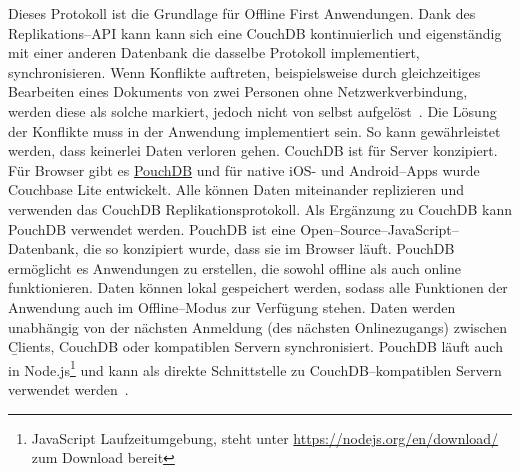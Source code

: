 Dieses Protokoll ist die Grundlage für Offline First Anwendungen.
Dank des Replikations--\gls{API} kann kann sich eine CouchDB kontinuierlich und eigenständig mit einer anderen Datenbank die dasselbe Protokoll implementiert, synchronisieren.
Wenn Konflikte auftreten, beispielsweise durch gleichzeitiges Bearbeiten eines Dokuments von zwei Personen ohne Netzwerkverbindung, werden diese als solche markiert, jedoch nicht von selbst aufgelöst~\cite{couch}. Die Lösung der Konflikte muss in der Anwendung implementiert sein.
So kann gewährleistet werden, dass keinerlei Daten verloren gehen.
%
%
CouchDB ist für Server konzipiert. Für Browser gibt es \hyperref[sub:pouch]{PouchDB} und für native iOS- und Android--\glspl{App} wurde Couchbase Lite entwickelt. Alle können Daten miteinander replizieren und verwenden das CouchDB Replikationsprotokoll.
Als Ergänzung zu CouchDB kann PouchDB verwendet werden. PouchDB ist eine Open--Source--JavaScript--Datenbank, die so konzipiert wurde, dass sie im Browser läuft. PouchDB ermöglicht es Anwendungen zu erstellen, die sowohl offline als auch online funktionieren. Daten können lokal gespeichert werden, sodass alle Funktionen der Anwendung auch im Offline--Modus zur Verfügung stehen.
Daten werden unabhängig von der nächsten Anmeldung (des nächsten Onlinezugangs) zwischen \b{Clients}, CouchDB oder kompatiblen Servern synchronisiert.
PouchDB läuft auch in Node.js\footnote{JavaScript Laufzeitumgebung, steht unter \url{https://nodejs.org/en/download/} zum Download bereit} und kann als direkte Schnittstelle zu CouchDB--kompatiblen Servern verwendet werden~\cite{pouch}.

